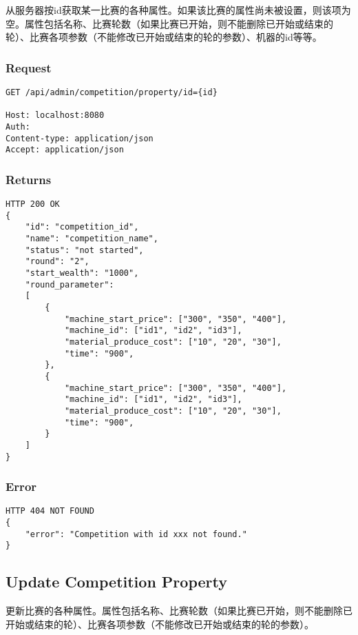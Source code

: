 \documentclass{article}
\begin{document}
从服务器按id获取某一比赛的各种属性。如果该比赛的属性尚未被设置，则该项为空。属性包括名称、比赛轮数（如果比赛已开始，则不能删除已开始或结束的轮）、比赛各项参数（不能修改已开始或结束的轮的参数）、机器的id等等。

\subsubsection*{Request}
\begin{lstlisting}
GET /api/admin/competition/property/id={id}

Host: localhost:8080
Auth:
Content-type: application/json
Accept: application/json
\end{lstlisting}

\subsubsection*{Returns}
\begin{lstlisting}
HTTP 200 OK
{
    "id": "competition_id",
    "name": "competition_name",
    "status": "not started",
    "round": "2",
    "start_wealth": "1000",
    "round_parameter":
    [
        {
            "machine_start_price": ["300", "350", "400"],
            "machine_id": ["id1", "id2", "id3"],
            "material_produce_cost": ["10", "20", "30"],
            "time": "900",
        },
        {
            "machine_start_price": ["300", "350", "400"],
            "machine_id": ["id1", "id2", "id3"],
            "material_produce_cost": ["10", "20", "30"],
            "time": "900",
        }
    ]
}

\end{lstlisting}

\subsubsection*{Error}
\begin{lstlisting}
HTTP 404 NOT FOUND
{
    "error": "Competition with id xxx not found."
}
\end{lstlisting}

\subsection{Update Competition Property}

更新比赛的各种属性。属性包括名称、比赛轮数（如果比赛已开始，则不能删除已开始或结束的轮）、比赛各项参数（不能修改已开始或结束的轮的参数）。
\end{document}
